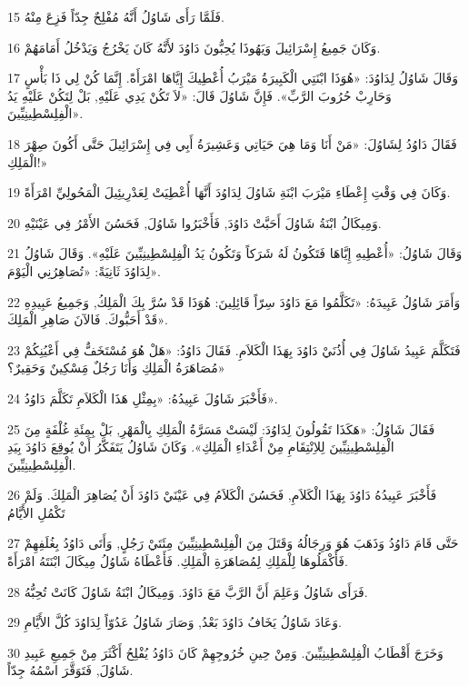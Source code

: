 \par 15 فَلَمَّا رَأَى شَاوُلُ أَنَّهُ مُفْلِحٌ جِدّاً فَزِعَ مِنْهُ.
\par 16 وَكَانَ جَمِيعُ إِسْرَائِيلَ وَيَهُوذَا يُحِبُّونَ دَاوُدَ لأَنَّهُ كَانَ يَخْرُجُ وَيَدْخُلُ أَمَامَهُمْ.
\par 17 وَقَالَ شَاوُلُ لِدَاوُدَ: «هُوَذَا ابْنَتِي الْكَبِيرَةُ مَيْرَبُ أُعْطِيكَ إِيَّاهَا امْرَأَةً. إِنَّمَا كُنْ لِي ذَا بَأْسٍ وَحَارِبْ حُرُوبَ الرَّبِّ». فَإِنَّ شَاوُلَ قَالَ: «لاَ تَكُنْ يَدِي عَلَيْهِ, بَلْ لِتَكُنْ عَلَيْهِ يَدُ الْفِلِسْطِينِيِّينَ».
\par 18 فَقَالَ دَاوُدُ لِشَاوُلَ: «مَنْ أَنَا وَمَا هِيَ حَيَاتِي وَعَشِيرَةُ أَبِي فِي إِسْرَائِيلَ حَتَّى أَكُونَ صِهْرَ الْمَلِكِ!»
\par 19 وَكَانَ فِي وَقْتِ إِعْطَاءِ مَيْرَبَ ابْنَةِ شَاوُلَ لِدَاوُدَ أَنَّهَا أُعْطِيَتْ لِعَدْرِيئِيلَ الْمَحُولِيِّ امْرَأَةً.
\par 20 وَمِيكَالُ ابْنَةُ شَاوُلَ أَحَبَّتْ دَاوُدَ, فَأَخْبَرُوا شَاوُلَ, فَحَسُنَ الأَمْرُ فِي عَيْنَيْهِ.
\par 21 وَقَالَ شَاوُلُ: «أُعْطِيهِ إِيَّاهَا فَتَكُونُ لَهُ شَرَكاً وَتَكُونُ يَدُ الْفِلِسْطِينِيِّينَ عَلَيْهِ». وَقَالَ شَاوُلُ لِدَاوُدَ ثَانِيَةً: «تُصَاهِرُنِي الْيَوْمَ».
\par 22 وَأَمَرَ شَاوُلُ عَبِيدَهُ: «تَكَلَّمُوا مَعَ دَاوُدَ سِرّاً قَائِلِينَ: هُوَذَا قَدْ سُرَّ بِكَ الْمَلِكُ, وَجَمِيعُ عَبِيدِهِ قَدْ أَحَبُّوكَ. فَالآنَ صَاهِرِ الْمَلِكَ».
\par 23 فَتَكَلَّمَ عَبِيدُ شَاوُلَ فِي أُذُنَيْ دَاوُدَ بِهَذَا الْكَلاَمِ. فَقَالَ دَاوُدُ: «هَلْ هُوَ مُسْتَخَفٌّ فِي أَعْيُنِكُمْ مُصَاهَرَةُ الْمَلِكِ وَأَنَا رَجُلٌ مَِسْكِينٌ وَحَقِيرٌ؟»
\par 24 فَأَخْبَرَ شَاوُلَ عَبِيدُهُ: «بِمِثْلِ هَذَا الْكَلاَمِ تَكَلَّمَ دَاوُدُ».
\par 25 فَقَالَ شَاوُلُ: «هَكَذَا تَقُولُونَ لِدَاوُدَ: لَيْسَتْ مَسَرَّةُ الْمَلِكِ بِالْمَهْرِ, بَلْ بِمِئَةِ غُلْفَةٍ مِنَ الْفِلِسْطِينِيِّينَ لِلاِنْتِقَامِ مِنْ أَعْدَاءِ الْمَلِكِ». وَكَانَ شَاوُلُ يَتَفَكَّرُ أَنْ يُوقِعَ دَاوُدَ بِيَدِ الْفِلِسْطِينِيِّينَ.
\par 26 فَأَخْبَرَ عَبِيدُهُ دَاوُدَ بِهَذَا الْكَلاَمِ, فَحَسُنَ الْكَلاَمُ فِي عَيْنَيْ دَاوُدَ أَنْ يُصَاهِرَ الْمَلِكَ. وَلَمْ تَكْمُلِ الأَيَّامُ
\par 27 حَتَّى قَامَ دَاوُدُ وَذَهَبَ هُوَ وَرِجَالُهُ وَقَتَلَ مِنَ الْفِلِسْطِينِيِّينَ مِئَتَيْ رَجُلٍ, وَأَتَى دَاوُدُ بِغُلَفِهِمْ فَأَكْمَلُوهَا لِلْمَلِكِ لِمُصَاهَرَةِ الْمَلِكِ. فَأَعْطَاهُ شَاوُلُ مِيكَالَ ابْنَتَهُ امْرَأَةً.
\par 28 فَرَأَى شَاوُلُ وَعَلِمَ أَنَّ الرَّبَّ مَعَ دَاوُدَ. وَمِيكَالُ ابْنَةُ شَاوُلَ كَانَتْ تُحِبُّهُ.
\par 29 وَعَادَ شَاوُلُ يَخَافُ دَاوُدَ بَعْدُ, وَصَارَ شَاوُلُ عَدُوّاً لِدَاوُدَ كُلَّ الأَيَّامِ.
\par 30 وَخَرَجَ أَقْطَابُ الْفِلِسْطِينِيِّينَ. وَمِنْ حِينِ خُرُوجِهِمْ كَانَ دَاوُدُ يُفْلِحُ أَكْثَرَ مِنْ جَمِيعِ عَبِيدِ شَاوُلَ, فَتَوَقَّرَ اسْمُهُ جِدّاً.

